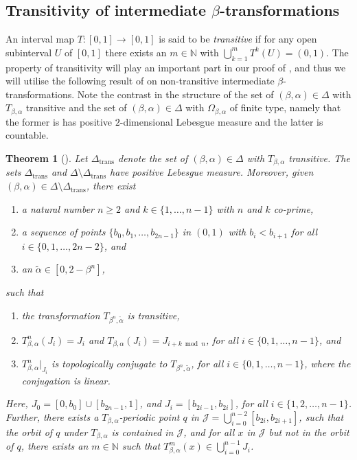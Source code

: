 \documentclass[a4paper,reqno,10pt]{amsart}
\newtheorem{theorem}{Theorem}[section]
\begin{document}
%
%
%
\subsection{Transitivity of intermediate \texorpdfstring{$\beta$}{beta}-transformations}
%
%
%

An interval map $T \colon [0,1] \to [0,1]$ is said to be \textsl{transitive} if for any open subinterval $U$ of $[0,1]$ there exists an $m \in \mathbb{N}$ with $\bigcup_{k = 1}^{m} T^{k}(U) = (0,1)$. The property of transitivity will play an important part in our proof of , and thus we will utilise the following result of \cite{G1990,Palmer79} on non-transitive intermediate $\beta$-transformations.  Note the contrast in the structure of the set of $(\beta, \alpha) \in \Delta$ with $T_{\beta,\alpha}$ transitive and the set of $(\beta, \alpha) \in \Delta$ with $\Omega_{\beta, \alpha}$ of finite type, namely that the former is has positive $2$-dimensional Lebesgue measure and the latter is countable. 

\begin{theorem}[{\cite{G1990,Palmer79}}]\label{thm:G1990+Palmer79}
Let $\Delta_{\operatorname{trans}}$ denote the set of $(\beta, \alpha) \in \Delta$ with $T_{\beta,\alpha}$ transitive.  The sets $\Delta_{\operatorname{trans}}$ and $\Delta \setminus \Delta_{\operatorname{trans}}$ have positive Lebesgue measure.  Moreover, given $(\beta, \alpha) \in \Delta \setminus \Delta_{\operatorname{trans}}$, there exist
        \begin{enumerate}[label={\rm(\roman*)}]
        \item a natural number $n \geq 2$ and $k \in \{1,\ldots, n-1\}$ with $n$ and $k$ co-prime,
        \item a sequence of points $\{ b_{0}, b_{1}, \ldots, b_{2n-1}\}$ in $(0,1)$ with $b_{i} < b_{i+1}$ for all $i \in \{0, 1, \ldots, 2n-2\}$, and
        \item an $\tilde{\alpha} \in [0, 2-\beta^{n}]$,
     \end{enumerate}
such that 
        \begin{enumerate}[label={\rm(\arabic*)}]
        \item the transformation $T_{\beta^{n},\tilde{\alpha}}$ is transitive, 
        \item $T_{\beta,\alpha}^{n}(J_{i}) = J_{i}$ and $T_{\beta,\alpha}(J_{i}) = J_{i+k \bmod{n}}$, for all $i \in \{ 0, 1, \ldots, n-1 \}$, and
        \item $T_{\beta,\alpha}^{n}\vert_{J_{i}}$ is topologically conjugate to $T_{\beta^{n},\tilde{\alpha}}$, for all $i \in \{ 0, 1, \ldots, n-1 \}$, where the conjugation is linear.
     \end{enumerate}
Here, $J_{0} = [0, b_{0}] \cup [b_{2n-1}, 1]$, and $J_{i} = [b_{2i-1}, b_{2i}]$, for all $i \in \{1, 2, \ldots, n-1\}$. Further, there exists a $T_{\beta,\alpha}$-periodic point $q$ in $\mathscr{J}=\bigcup_{i = 0}^{n-2} [b_{2i}, b_{2i+1}]$, such that the orbit of $q$ under $T_{\beta,\alpha}$ is contained in $\mathscr{J}$, and for all $x$ in $\mathscr{J}$ but not in the orbit of $q$, there exists an $m \in \mathbb{N}$ such that $T_{\beta,\alpha}^{m}(x) \in \bigcup_{i = 0}^{n-1} J_{i}$.
\end{theorem}
\end{document}
